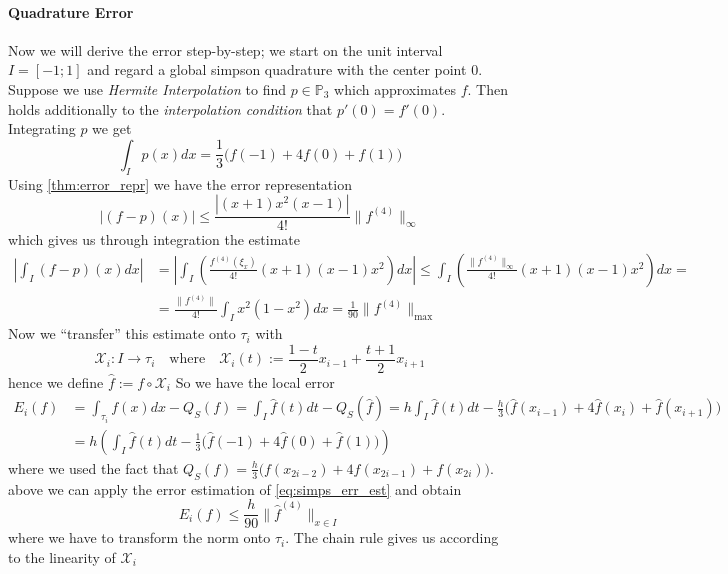\paragraph{Quadrature Error}
Now we will derive the error step-by-step; we start on the unit interval \(I = [-1; 1]\) and regard a global simpson quadrature with the center point \(0\).
Suppose we use \emph{Hermite Interpolation} to find \(p \in \mathbb{P}_3\) which approximates \(f\).
Then holds additionally to the \emph{interpolation condition} that \(p'(0) = f'(0)\).
Integrating \(p\) we get
\[\int_I p(x) dx = \frac{1}{3} \big(f(-1) + 4f(0) + f(1)\big)\]
Using \cref{thm:error_repr} we have the error representation
\[|(f-p)(x)| \leq \frac{|(x+1)x^2(x - 1)|}{4!}\|f^{(4)}\|_{\infty}\]
which gives us through integration the estimate
\begin{equation}\label{eq:simps_err_est}
   \begin{split}
      \left| \int_I (f-p)(x) dx\right| & = \left|\int_I \left(\frac{f^{(4)}(\xi_x)}{4!} (x+1)(x-1)x^2\right) dx\right| \leq \int_I \left(\frac{\|f^{(4)}\|_{\infty}}{4!} (x+1)(x-1)x^2\right) dx = \\
                                       & = \frac{\|f^{(4)}\|_{}}{4!} \int_I x^2(1-x^2) dx = \frac{1}{90} \|f^{(4)}\|_{\max}
   \end{split}
\end{equation}
Now we ``transfer'' this estimate onto \(\tau_i\) with
\[\mathcal{X}_i: I \to \tau_i \quad\text{where}\quad \mathcal{X}_i(t) := \frac{1-t}{2} x_{i-1} + \frac{t + 1}{2} x_{i+1}\]
hence we define \(\hat{f} := f \circ \mathcal{X}_i\)
So we have the local error
\begin{equation*}
   \begin{split}
      E_i(f) & = \int_{\tau_i} f(x) dx - Q_S(f) = \int_I \hat{f}(t) dt - Q_S(\hat{f}) = h \int_I \hat{f}(t)dt - \frac{h}{3} \big(\hat{f}(x_{i-1}) + 4\hat{f}(x_i) + \hat{f}(x_{i+1})\big)\\
             & = h \left(\int_I \hat{f}(t) dt - \frac{1}{3} \big(\hat{f}(-1) + 4\hat{f}(0) + \hat{f}(1)\big)\right)
   \end{split}
\end{equation*}
where we used the fact that \(Q_S(f) = \frac{h}{3}\big(f(x_{2i-2}) + 4f(x_{2i-1}) + f(x_{2i})\big)\).
above we can apply the error estimation of \cref{eq:simps_err_est} and obtain
\[E_i(f) \leq \frac{h}{90} \|\hat{f}^{(4)}\|_{x \in I}\]
where we have to transform the norm onto \(\tau_i\).
The chain rule gives us according to the linearity of \(\mathcal{X}_i\)

